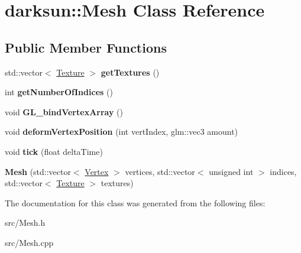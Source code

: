 \hypertarget{classdarksun_1_1_mesh}{}\section{darksun\+::Mesh Class Reference}
\label{classdarksun_1_1_mesh}
\subsection*{Public Member Functions}
\begin{DoxyCompactItemize}
\item 
\mbox{\label{classdarksun_1_1_mesh_a3c31122a798b49cbd241d85442105311}} 
std\+::vector$<$ \mbox{\hyperlink{structdarksun_1_1_texture}{Texture}} $>$ {\bfseries get\+Textures} ()
\item 
\mbox{\label{classdarksun_1_1_mesh_a1148f6db7ea935b789195e5505253015}} 
int {\bfseries get\+Number\+Of\+Indices} ()
\item 
\mbox{\label{classdarksun_1_1_mesh_a90e51f19ad7e9cd1167fc9045322c0e2}} 
void {\bfseries G\+L\+\_\+bind\+Vertex\+Array} ()
\item 
\mbox{\label{classdarksun_1_1_mesh_a83a82890dab583a65695a08f20c71dc2}} 
void {\bfseries deform\+Vertex\+Position} (int vert\+Index, glm\+::vec3 amount)
\item 
\mbox{\label{classdarksun_1_1_mesh_a92e079b68fb3321607aba940435298c0}} 
void {\bfseries tick} (float delta\+Time)
\item 
\mbox{\label{classdarksun_1_1_mesh_a5d0b82c7f381bcdb2430e3dcd987e506}} 
{\bfseries Mesh} (std\+::vector$<$ \mbox{\hyperlink{structdarksun_1_1_vertex}{Vertex}} $>$ vertices, std\+::vector$<$ unsigned int $>$ indices, std\+::vector$<$ \mbox{\hyperlink{structdarksun_1_1_texture}{Texture}} $>$ textures)
\end{DoxyCompactItemize}


The documentation for this class was generated from the following files\+:\begin{DoxyCompactItemize}
\item 
src/Mesh.\+h\item 
src/Mesh.\+cpp\end{DoxyCompactItemize}
